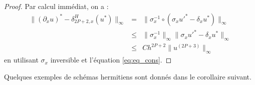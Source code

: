 \begin{proof}
Par calcul immédiat, on a :
\begin{equation}
\begin{array}{rcl}
\|  (\partial_x u)^* - \delta_{2P+2,x}^H (u^*) \|_{\infty} &=& \| \sigma_{x}^{-1} \circ \left( \sigma_{x} u'^*  - \delta_{x}u^*\right) \|_{\infty}\\
                                      &\leq& \| \sigma_{x}^{-1} \|_{\infty} \| \sigma_{x} u'^*  - \delta_{x}u^*\|_{\infty}\\
                                      &\leq& C h^{2P+2}  \| u^{(2P+3)} \|_{\infty}
\end{array}
\end{equation}
en utilisant $\sigma_{x}$ inversible et l'équation \eqref{eq:eq_cons}.
\end{proof}
Quelques exemples de schémas hermitiens sont donnés dans le corollaire suivant.

